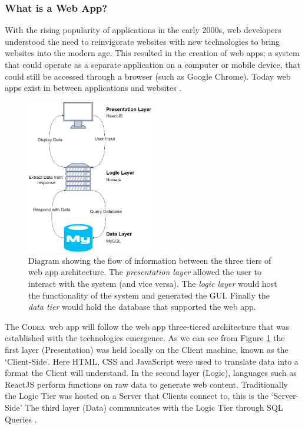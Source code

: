 \documentclass[final]{cmpreport}
\newcommand{\Codex}{\textsc{Codex}}
\begin{document}
			\subsubsection{What is a Web App?} \label{sec:what-web-app}
			With the rising popularity of applications in the early 2000s, web developers understood the need to reinvigorate websites with new technologies to bring websites into the modern age. This resulted in the creation of web apps; a system that could operate as a separate application on a computer or mobile device, that could still be accessed through a browser (such as Google Chrome). Today web apps exist in between applications and websites \citep{web-apps}. 
			
			\begin{figure}[h]
				\centering
				\includegraphics[width=0.5\textwidth]{web-app-arch.PNG}
				\caption[Three Tiered Web App Architecture]{Diagram showing the flow of information between the three tiers of web app architecture. The \emph{presentation layer} allowed the user to interact with the system (and vice versa). The \emph{logic layer} would host the functionality of the system and generated the GUI. Finally the \emph{data tier} would hold the database that supported the web app.} \label{fig:web-apps}
			\end{figure}
		
			The \Codex \ web app will follow the web app three-tiered architecture that was established with the technologies emergence. As we can see from Figure \ref{fig:web-apps} the first layer (Presentation) was held locally on the Client machine, known as the `Client-Side'. Here HTML, CSS and JavaScript were used to translate data into a format the Client will understand. In the second layer (Logic), languages such as ReactJS perform functions on raw data to generate web content. Traditionally the Logic Tier was hosted on a Server that Clients connect to, this is the `Server-Side' The third layer (Data) communicates with the Logic Tier through SQL Queries \citep{SecurityWebApps}. 
			
\end{document}
